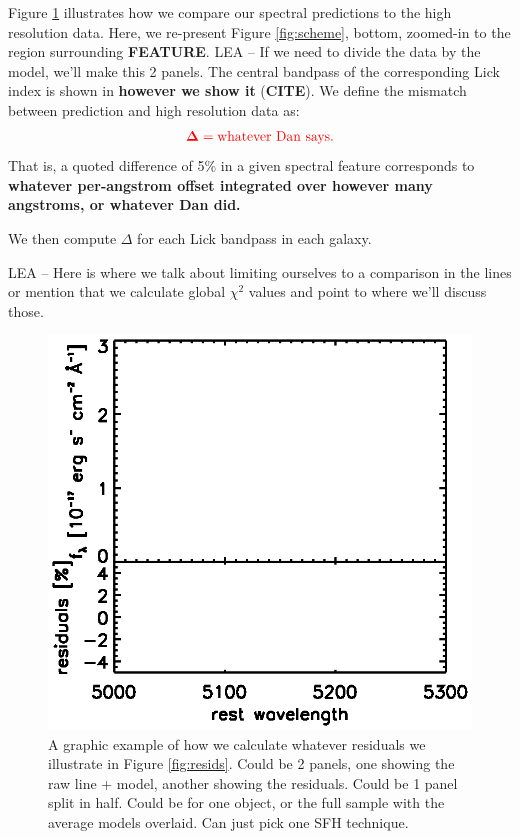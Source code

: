 \documentclass[a4paper,fleqn,usenatbib]{mnras}
\newcommand{\bfr}{\bf\color{red}}
\newcommand{\bfb}{\color{myblue}}
\newcommand{\CITE}{{\bfr CITE}}
\begin{document}
Figure \ref{fig:metric} illustrates how we compare our spectral predictions to the high resolution data.
Here, we re-present Figure \ref{fig:scheme}, bottom, zoomed-in to the region surrounding {\bfr FEATURE}.
{\bfb LEA -- If we need to divide the data by the model, we'll make this 2 panels.} The central 
bandpass of the corresponding Lick index is shown in {\bfr however we show it} (\CITE). We define 
the mismatch between prediction and high resolution data as:
\begin{equation}
	\bfr \Delta = {\rm whatever~Dan~says}.
\end{equation}
That is, a quoted difference of 5\% in a given spectral feature corresponds to {\bfr whatever per-angstrom
offset integrated over however many angstroms, or whatever Dan did.}

We then compute {\bfr$\Delta$} for each Lick bandpass in each galaxy.

{\bfb LEA -- Here is where we talk about limiting ourselves to a comparison in the lines or mention
that we calculate global $\chi^{2}$ values and point to where we'll discuss those.}

\begin{figure}
	\centering
	\includegraphics[width = \columnwidth, trim = 0cm 0.7cm 0cm 0cm]{metric}
	\caption{\bfb A graphic example of how we calculate whatever residuals we illustrate
			in Figure \ref{fig:resids}. Could be 2 panels, one showing the raw line + model,
			another showing the residuals. Could be 1 panel split in half. Could be for one
			object, or the full sample with the average models overlaid. Can just pick one
			SFH technique.}
	\label{fig:metric}
\end{figure}
\end{document}
